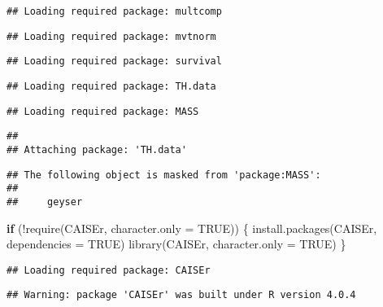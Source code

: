 \documentclass[
]{article}
\newenvironment{Shaded}{\begin{snugshade}}{\end{snugshade}}
\newcommand{\AttributeTok}[1]{\textcolor[rgb]{0.77,0.63,0.00}{#1}}
\newcommand{\ConstantTok}[1]{\textcolor[rgb]{0.00,0.00,0.00}{#1}}
\newcommand{\ControlFlowTok}[1]{\textcolor[rgb]{0.13,0.29,0.53}{\textbf{#1}}}
\newcommand{\FunctionTok}[1]{\textcolor[rgb]{0.00,0.00,0.00}{#1}}
\newcommand{\NormalTok}[1]{#1}
\newcommand{\SpecialCharTok}[1]{\textcolor[rgb]{0.00,0.00,0.00}{#1}}
\newcommand{\StringTok}[1]{\textcolor[rgb]{0.31,0.60,0.02}{#1}}
\begin{document}
\begin{verbatim}
## Loading required package: multcomp
\end{verbatim}

\begin{verbatim}
## Loading required package: mvtnorm
\end{verbatim}

\begin{verbatim}
## Loading required package: survival
\end{verbatim}

\begin{verbatim}
## Loading required package: TH.data
\end{verbatim}

\begin{verbatim}
## Loading required package: MASS
\end{verbatim}

\begin{verbatim}
## 
## Attaching package: 'TH.data'
\end{verbatim}

\begin{verbatim}
## The following object is masked from 'package:MASS':
## 
##     geyser
\end{verbatim}

\begin{Shaded}
\begin{Highlighting}[]
\ControlFlowTok{if}\NormalTok{ (}\SpecialCharTok{!}\FunctionTok{require}\NormalTok{(}\StringTok{\textquotesingle{}CAISEr\textquotesingle{}}\NormalTok{, }\AttributeTok{character.only =} \ConstantTok{TRUE}\NormalTok{)) \{}
      \FunctionTok{install.packages}\NormalTok{(}\StringTok{\textquotesingle{}CAISEr\textquotesingle{}}\NormalTok{, }\AttributeTok{dependencies =} \ConstantTok{TRUE}\NormalTok{)}
      \FunctionTok{library}\NormalTok{(}\StringTok{\textquotesingle{}CAISEr\textquotesingle{}}\NormalTok{, }\AttributeTok{character.only =} \ConstantTok{TRUE}\NormalTok{)}
\NormalTok{\}}
\end{Highlighting}
\end{Shaded}

\begin{verbatim}
## Loading required package: CAISEr
\end{verbatim}

\begin{verbatim}
## Warning: package 'CAISEr' was built under R version 4.0.4
\end{verbatim}
\end{document}
